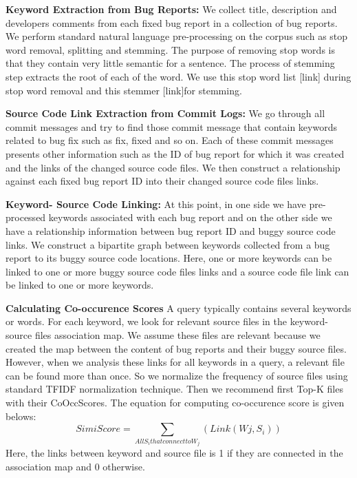 \documentclass[conference]{IEEEtran}
\begin{document}
\textbf{Keyword Extraction from Bug Reports:} We collect title, description and developers comments from each fixed bug report in a collection of bug reports. We perform standard natural language pre-processing on the corpus such as stop word removal, splitting and stemming. The purpose of removing stop words is that they contain very little semantic for a sentence. The process of stemming step extracts the root of each of the word. We use this stop word list [link] during stop word removal and this stemmer [link]for stemming. 

\textbf{Source Code Link Extraction from Commit Logs:}
We go through all commit messages and try to find those commit message that contain keywords related to bug fix such as fix, fixed and so on. Each of these commit messages presents other information such as the ID of bug report for which it was created and the links of the changed source code files. We then construct a relationship against each fixed bug report ID into their changed source code files links.

\textbf{Keyword- Source Code Linking:}
At this point, in one side we have pre-processed keywords associated with each bug report and on the other side we have a relationship information between bug report ID and buggy source code links. We construct a bipartite graph between keywords collected from a bug report to its buggy source code locations. Here, one or more keywords can be linked to one or more buggy source code files links and a source code file link can be linked to one or more keywords.

\textbf{Calculating Co-occurence Scores}
A query typically contains several keywords or words. For each keyword, we look for relevant source files in the keyword-source files association map. We assume these files are relevant because we created the map between the content of bug reports and their buggy source files. However, when we analysis these links for all keywords in a query, a relevant file can be found more than once. So we normalize the frequency of source files using standard TFIDF normalization technique. Then we recommend first Top-K files with their CoOccScores. The equation for computing co-occurence score is given belows:
\begin{equation}\label{CoOccequation}
SimiScore=\sum_{All S_{i} that connect to W_{j}}(Link(W{j},S_{i}))
\end{equation}
Here, the links between keyword and source file is 1 if they are connected in the association map and 0 otherwise.
\end{document}
